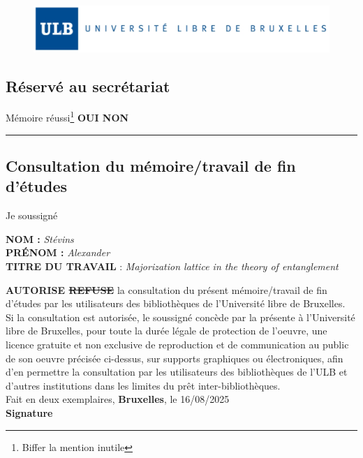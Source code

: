 \begin{figure}
    \centering
    \includegraphics[width=\linewidth]{images/ulb.png}
\end{figure}

\subsection*{R\'eserv\'e au secr\'etariat}

M\'emoire r\'eussi\footnote{Biffer la mention inutile} \textbf{OUI NON}\\

\vspace{0.5cm}

\hrule

\vspace{0.5cm}

\subsection*{Consultation du m\'emoire/travail de fin d'\'etudes}


\noindent Je soussign\'e\\

\begin{minipage}[b]{0.05\linewidth} 
\end{minipage}\hfill
\begin{minipage}[b]{0.95\linewidth}   
\textbf{NOM :} \textit{St\'evins}\\
\textbf{PR\'ENOM :} \textit{Alexander}\\
\textbf{TITRE DU TRAVAIL} : \textit{Majorization lattice in the theory of entanglement}\\
\end{minipage}



\noindent\textbf{AUTORISE \sout{REFUSE}} la consultation du pr\'esent m\'emoire/travail de fin d'\'etudes par les utilisateurs des biblioth\`eques de l'Universit\'e libre de Bruxelles.\\

Si la consultation est autoris\'ee, le soussign\'e conc\`ede par la pr\'esente \`a l'Universit\'e libre de Bruxelles, pour toute la dur\'ee l\'egale de protection de l'oeuvre, une licence gratuite et non exclusive de reproduction et de communication au public de son oeuvre pr\'ecis\'ee ci-dessus, sur supports graphiques ou \'electroniques, afin d'en permettre la consultation par les utilisateurs des biblioth\`eques de l'ULB et d'autres institutions dans les limites du pr\^et inter-biblioth\`eques.\\

Fait en deux exemplaires, \textbf{Bruxelles}, le 16/08/2025\\
\textbf{Signature}

